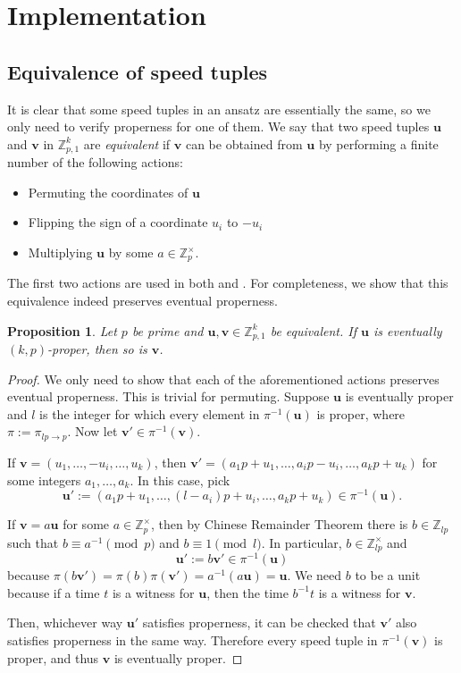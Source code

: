 \documentclass[11pt]{amsart}
\newcommand{\Unit}[1]{\Z_{#1}^\times}
\newcommand{\Z}{\mathbb{Z}}
\newcommand{\vbf}{\mathbf{v}}
\newcommand{\ubf}{\mathbf{u}}
\newtheorem{proposition}[theorem]{Proposition}
\theoremstyle{definition}
\theoremstyle{remark}
\begin{document}
\section{Implementation}
\label{sec:algo}

\subsection{Equivalence of speed tuples}
\label{subsec:equiv}
It is clear that some speed tuples in an ansatz are essentially the same, so we only need to verify properness for one of them.
We say that two speed tuples $\ubf$ and $\vbf$ in $\Z_{p,1}^k$ are \emph{equivalent} if $\vbf$ can be obtained from $\ubf$ 
by performing a finite number of the following actions:
\begin{itemize}
    \item Permuting the coordinates of $\ubf$
    \item Flipping the sign of a coordinate $u_i$ to $-u_i$
    \item Multiplying $\ubf$ by some $a\in\Unit{p}$.
\end{itemize}

The first two actions are used in both \cite{Rosenfeld} and \cite{Trakulthongchai}.
For completeness, we show that this equivalence indeed preserves eventual properness.

\begin{proposition}
  \label{prop:equivproper}
  Let $p$ be prime and $\ubf,\vbf\in\Z_{p,1}^k$ be equivalent.
  If $\ubf$ is eventually $(k,p)$-proper, then so is $\vbf$.
\end{proposition}
\begin{proof}
  We only need to show that each of the aforementioned actions preserves eventual properness.
  This is trivial for permuting.
  Suppose $\ubf$ is eventually proper and $l$ is the integer for which every element in $\pi^{-1}(\ubf)$ is proper,
  where $\pi:=\pi_{lp\rightarrow p}$. Now let $\vbf'\in \pi^{-1}(\vbf)$.

  If $\vbf=(u_1,\ldots,-u_i,\ldots,u_k)$, 
  then $\vbf'=(a_1p+u_1,\ldots,a_ip-u_i,\ldots,a_kp+u_k)$ for some integers $a_1,\ldots,a_k$. 
  In this case, pick 
  \[\ubf':=(a_1p+u_1,\ldots,(l-a_i)p+u_i,\ldots,a_kp+u_k)\in\pi^{-1}(\ubf).\]

  If $\vbf=a\ubf$ for some $a\in\Unit{p}$, 
  then by Chinese Remainder Theorem there is $b\in\Z_{lp}$ such that $b\equiv a^{-1} \pmod{p}$ and $b\equiv1\pmod{l}$. 
  In particular, $b\in\Unit{lp}$ and 
  \[\ubf':=b\vbf'\in\pi^{-1}(\ubf)\]
  because $\pi(b\vbf')=\pi(b)\pi(\vbf')=a^{-1}(a\ubf)=\ubf$. 
  We need $b$ to be a unit because if a time $t$ is a witness for $\ubf$, 
  then the time $b^{-1}t$ is a witness for $\vbf$.

  Then, whichever way $\ubf'$ satisfies properness,
  it can be checked that $\vbf'$ also satisfies properness in the same way.
  Therefore every speed tuple in $\pi^{-1}(\vbf)$ is proper, and thus $\vbf$ is eventually proper.
\end{proof}
\end{document}
